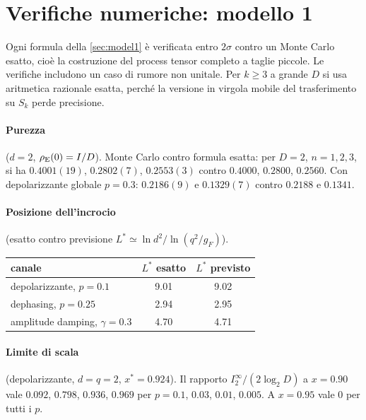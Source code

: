 \section{Verifiche numeriche: modello 1}\label{app:num1}

Ogni formula della \cref{sec:model1} è verificata entro $2\sigma$ contro un Monte Carlo esatto, cioè la costruzione del process tensor completo a taglie piccole. Le verifiche includono un caso di rumore non unitale. Per $k\ge3$ a grande $D$ si usa aritmetica razionale esatta, perché la versione in virgola mobile del trasferimento su $S_k$ perde precisione.

\paragraph{Purezza} ($d=2$, $\rho_{\rm E}(0)=I/D$). Monte Carlo contro formula esatta: per $D=2$, $n=1,2,3$, si ha $0.4001(19)$, $0.2802(7)$, $0.2553(3)$ contro $0.4000$, $0.2800$, $0.2560$. Con depolarizzante globale $p=0.3$: $0.2186(9)$ e $0.1329(7)$ contro $0.2188$ e $0.1341$.

\paragraph{Posizione dell'incrocio} (esatto contro previsione $L^*\simeq\ln d^2/\ln(q^2/g_F)$).
\begin{center}\small
\begin{tabular}{@{}lcc@{}}
\toprule
canale & $L^*$ esatto & $L^*$ previsto\\
\midrule
depolarizzante, $p=0.1$ & 9.01 & 9.02\\
dephasing, $p=0.25$ & 2.94 & 2.95\\
amplitude damping, $\gamma=0.3$ & 4.70 & 4.71\\
\bottomrule
\end{tabular}
\end{center}

\paragraph{Limite di scala} (depolarizzante, $d=q=2$, $x^*=0.924$). Il rapporto $I_2^\infty/(2\log_2D)$ a $x=0.90$ vale $0.092$, $0.798$, $0.936$, $0.969$ per $p=0.1$, $0.03$, $0.01$, $0.005$. A $x=0.95$ vale $0$ per tutti i $p$.

